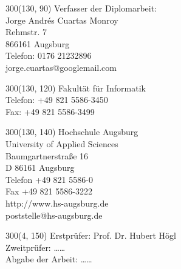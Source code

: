 \begin{titlepage}
\begin{textblock}{300}(130, 90)
\fontsize{8}{8}
\selectfont 
\parindent0mm
Verfasser der Diplomarbeit:\\
Jorge Andrés Cuartas Monroy\\
Rehmstr. 7\\
866161 Augsburg\\
Telefon: 0176 21232896\\
jorge.cuartas@googlemail.com
\end{textblock}

\begin{textblock}{300}(130, 120)
\fontsize{8}{8}
\selectfont 
\parindent0mm
Fakultät für Informatik\\
Telefon: +49 821 5586-3450\\
Fax:       +49 821 5586-3499\\
\end{textblock}

\begin{textblock}{300}(130, 140)
\fontsize{8}{8}
\selectfont 
\parindent0mm
Hochschule Augsburg\\
University of Applied Sciences\\
Baumgartnerstraße 16\\
D 86161 Augsburg\\

Telefon +49 821 5586-0\\
Fax +49 821 5586-3222\\
http://www.hs-augsburg.de\\
poststelle@hs-augsburg.de
\end{textblock}


\begin{textblock}{300}(4, 150)
\fontsize{20}{20}
\selectfont 
\parindent0mm
Erstprüfer: Prof. Dr. Hubert Högl\\
Zweitprüfer: \ldots \ldots\\
Abgabe der Arbeit: \ldots \ldots
\end{textblock}

\end{titlepage}